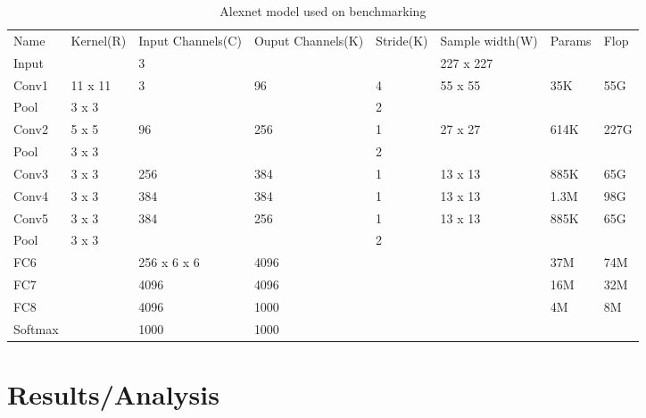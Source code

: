 \documentclass[conference]{IEEEtran}
\begin{document}
\begin{table}[]
\centering
\caption{Alexnet model used on benchmarking}
\label{alex_model}
\begin{tabular}{llllllll}
Name    & Kernel(R) & Input Channels(C) & Ouput Channels(K) & Stride(K) & Sample width(W) & Params & Flop \\
Input   &           & 3                 &                   &           & 227 x 227       &        &      \\
Conv1   & 11 x 11   & 3                 & 96                & 4         & 55 x 55         & 35K    & 55G  \\
Pool    & 3 x 3     &                   &                   & 2         &                 &        &      \\
Conv2   & 5 x 5     & 96                & 256               & 1         & 27 x 27         & 614K   & 227G \\
Pool    & 3 x 3     &                   &                   & 2         &                 &        &      \\
Conv3   & 3 x 3     & 256               & 384               & 1         & 13 x 13         & 885K   & 65G  \\
Conv4   & 3 x 3     & 384               & 384               & 1         & 13 x 13         & 1.3M   & 98G  \\
Conv5   & 3 x 3     & 384               & 256               & 1         & 13 x 13         & 885K   & 65G  \\
Pool    & 3 x 3     &                   &                   & 2         &                 &        &      \\
FC6     &           & 256 x 6 x 6       & 4096              &           &                 & 37M    & 74M  \\
FC7     &           & 4096              & 4096              &           &                 & 16M    & 32M  \\
FC8     &           & 4096              & 1000              &           &                 & 4M     & 8M   \\
Softmax &           & 1000              & 1000              &           &                 &        &     
\end{tabular}
\end{table}


\section{Results/Analysis}
\end{document}

